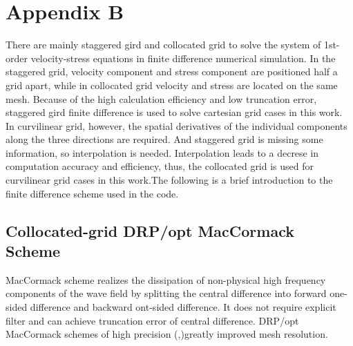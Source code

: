 \chapter{Appendix B}\label{appd_schemes}
There are mainly staggered gird and collocated grid to solve the system of 1st-order velocity-stress equations in finite difference numerical simulation. In the staggered grid, velocity component and stress component are positioned half a grid apart, while in collocated grid velocity and stress are located on the same mesh. Because of the high calculation efficiency and low truncation error, staggered gird finite difference is used to solve cartesian grid cases in this work. In curvilinear grid, however, the spatial derivatives of the individual components along the three directions are required. And staggered grid is missing some information, so interpolation is needed. Interpolation leads to a decrese in computation accuracy and efficiency, thus, the collocated grid is used for curvilinear grid cases in this work.The following is a brief introduction to the finite difference scheme used in the code. 
\section{Collocated-grid DRP/opt MacCormack Scheme} 
MacCormack scheme realizes the dissipation of non-physical high frequency components of the wave field by splitting the central difference into forward one-sided difference and backward ont-sided difference. It does not require explicit filter and can achieve truncation error of central difference. DRP/opt MacCormack schemes of high precision (\cite{hixon1997increasing},\cite{zhang2006traction})greatly improved mesh resolution.
